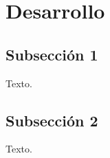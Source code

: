 \section{Desarrollo}

\subsection{Subsección 1}

Texto.


\FloatBarrier

\subsection{Subsección 2}

Texto.


\FloatBarrier